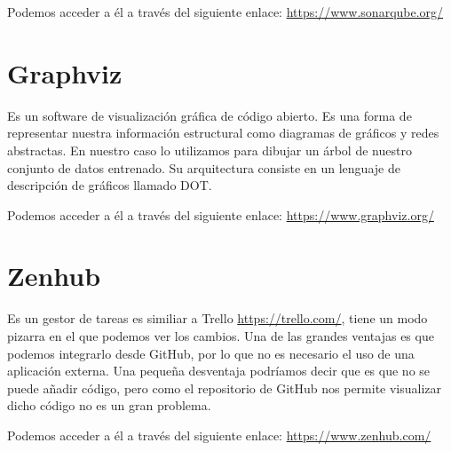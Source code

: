 Podemos acceder a él a través del siguiente enlace: 
\url{https://www.sonarqube.org/}

\section{Graphviz}
Es un software de visualización gráfica de código abierto. Es una forma de representar nuestra información estructural como diagramas de gráficos y redes abstractas. En nuestro caso lo utilizamos para dibujar un  árbol de nuestro conjunto de datos entrenado. Su arquitectura consiste en un lenguaje de descripción de gráficos llamado DOT.

Podemos acceder a él a través del siguiente enlace: 
\url{https://www.graphviz.org/}

\section{Zenhub}
Es un gestor de tareas es similiar a Trello \url{https://trello.com/}, tiene un modo pizarra en el que podemos ver los cambios. Una de las grandes ventajas es que podemos integrarlo desde GitHub, por lo que no es necesario el uso de una aplicación externa. Una pequeña desventaja podríamos decir que es que no se puede añadir código, pero como el repositorio de GitHub nos permite visualizar dicho código no es un gran problema.

Podemos acceder a él a través del siguiente enlace: 
\url{https://www.zenhub.com/}